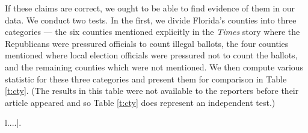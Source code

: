 \documentclass[11pt,titlepage]{article}
\begin{document}
If these claims are correct, we ought to be able to find evidence of
them in our data.  We conduct two tests.  In the first, we divide
Florida's counties into three categories --- the six counties
mentioned explicitly in the \emph{Times} story where the Republicans
were pressured officials to count illegal ballots, the four counties
mentioned where local election officials were pressured not
to count the ballots, and the remaining counties which were not
mentioned.  We then compute various statistic for these three
categories and present them for comparison in Table \ref{t:cty}.
(The results in this table were not available to the reporters before
their article appeared and so Table \ref{t:cty} does represent an
independent test.)
\begin{table}[t]
\begin{center}
  \begin{tabular}{l....|.}


\end{tabular}
\end{center}
\end{table}
\end{document}

